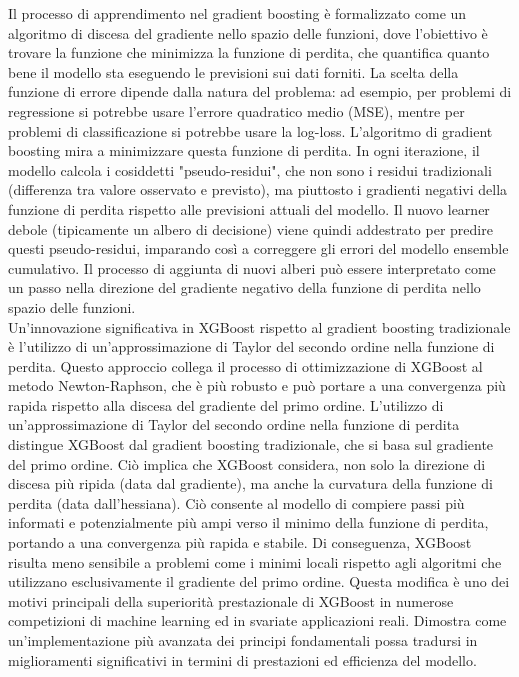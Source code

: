 \documentclass[a4paper,12pt]{report}
\begin{document}
	Il processo di apprendimento nel gradient boosting è formalizzato come un algoritmo di discesa del gradiente nello spazio delle funzioni, dove l'obiettivo è trovare la funzione che minimizza la funzione di perdita, che quantifica quanto bene il modello sta eseguendo le previsioni sui dati forniti. La scelta della funzione di errore dipende dalla natura del problema: ad esempio, per problemi di regressione si potrebbe usare l'errore quadratico medio (MSE), mentre per problemi di classificazione si potrebbe usare la log-loss. L'algoritmo di gradient boosting mira a minimizzare questa funzione di perdita. In ogni iterazione, il modello calcola i cosiddetti "pseudo-residui", che non sono i residui tradizionali (differenza tra valore osservato e previsto), ma piuttosto i gradienti negativi della funzione di perdita rispetto alle previsioni attuali del modello. Il nuovo learner debole (tipicamente un albero di decisione) viene quindi addestrato per predire questi pseudo-residui, imparando così a correggere gli errori del modello ensemble cumulativo. Il processo di aggiunta di nuovi alberi può essere interpretato come un passo nella direzione del gradiente negativo della funzione di perdita nello spazio delle funzioni. \\
	Un'innovazione significativa in XGBoost rispetto al gradient boosting tradizionale è l'utilizzo di un'approssimazione di Taylor del secondo ordine nella funzione di perdita. Questo approccio collega il processo di ottimizzazione di XGBoost al metodo Newton-Raphson, che è più robusto e può portare a una convergenza più rapida rispetto alla discesa del gradiente del primo ordine. L'utilizzo di un'approssimazione di Taylor del secondo ordine nella funzione di perdita distingue XGBoost dal gradient boosting tradizionale, che si basa sul gradiente del primo ordine. Ciò implica che XGBoost considera, non solo la direzione di discesa più ripida (data dal gradiente), ma anche la curvatura della funzione di perdita (data dall'hessiana). Ciò consente al modello di compiere passi più informati e potenzialmente più ampi verso il minimo della funzione di perdita, portando a una convergenza più rapida e stabile. Di conseguenza, XGBoost risulta meno sensibile a problemi come i minimi locali rispetto agli algoritmi che utilizzano esclusivamente il gradiente del primo ordine. Questa modifica è uno dei motivi principali della superiorità prestazionale di XGBoost in numerose competizioni di machine learning ed in svariate applicazioni reali. Dimostra come un'implementazione più avanzata dei principi fondamentali possa tradursi in miglioramenti significativi in termini di prestazioni ed efficienza del modello.
	
\end{document}
